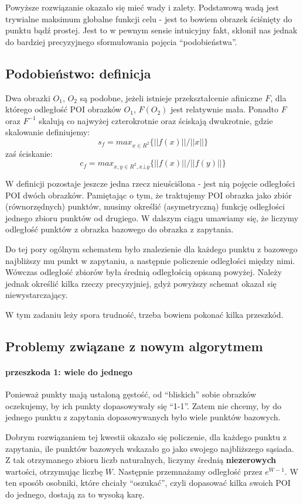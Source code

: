 \documentclass[a4paper,12pt,leqno]{article}
\begin{document}
Powyższe rozwiązanie okazało się mieć wady i zalety. Podstawową wadą jest trywialne maksimum globalne funkcji celu - jest to bowiem obrazek ściśnięty do punktu bądź prostej. 
Jest to w pewnym sensie intuicyjny fakt, skłonił nas jednak do bardziej precyzyjnego sformułowania pojęcia ``podobieństwa''. 

\subsection{Podobieństwo: definicja}
Dwa obrazki $O_1$, $O_2$ są podobne, jeżeli istnieje przekształcenie afiniczne $F$, dla którego odległość POI obrazków $O_1$, $F(O_2)$ jest relatywnie mała.
Ponadto $F$ oraz $F^{-1}$ skalują co najwyżej czterokrotnie oraz ściskają dwukrotnie, gdzie skalowanie definiujemy:
\[
s_f = max_{x \in R^2} \{ ||f(x)||/||x|| \} 
\]
zaś ściskanie:
\[
c_f = max_{x,y \in R^2, x \bot y} \{ ||f(x)||/||f(y)|| \}
\]

W definicji pozostaje jeszcze jedna rzecz nieuściślona - jest nią pojęcie odległości POI dwóch obrazków. Pamiętając o tym, że traktujemy POI obrazka jako zbiór (równorzędnych) punktów, 
musimy określić (asymetryczną) funkcję odległości jednego zbioru punktów od drugiego.
W dalszym ciągu umawiamy się, że liczymy odległość punktów z obrazka bazowego do obrazka z zapytania.

Do tej pory ogólnym schematem było znalezienie dla każdego punktu z bazowego najbliższy mu punkt w zapytaniu, a następnie policzenie odległości między nimi.
Wówczas odległość zbiorów była średnią odległością opisaną powyżej.
Należy jednak określić kilka rzeczy precyzyjniej, gdyż powyższy schemat okazał się niewystarczający.

W tym zadaniu leży spora trudność, trzeba bowiem pokonać kilka przeszkód.

\subsection{Problemy związane z nowym algorytmem}
\paragraph{przeszkoda 1: wiele do jednego}
Ponieważ punkty mają ustaloną gęstość, od ``bliskich'' sobie obrazków oczekujemy, by ich punkty dopasowywały się ``1-1''. 
Zatem nie chcemy, by do jednego punktu z zapytania dopasowywanych było wiele punktów bazowych. 

Dobrym rozwiązaniem tej kwestii okazało się policzenie, dla każdego punktu z zapytania, ile punktów bazowych wskazało go jako swojego najbliższego sąsiada. 
Z tak otrzymanego zbioru liczb naturalnych, liczymy średnią \textbf{niezerowych} wartości, otrzymując liczbę $W$.
Następnie przemnażamy odległość przez $e^{W-1}$. W ten sposób osobniki, które chciały ``oszukać'', czyli dopasować kilka swoich POI do jednego, dostają za to wysoką karę.
\end{document}
